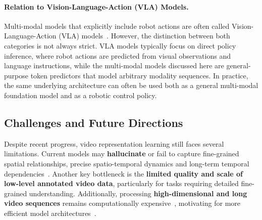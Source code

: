 \paragraph{Relation to Vision-Language-Action (VLA) Models.}
Multi-modal models that explicitly include robot actions are often called Vision-Language-Action (VLA) models~\cite{Din2025VisionLA, Kawaharazuka2025VisionLanguageActionMF}. 
However, the distinction between both categories is not always strict. 
\ac{VLA} models typically focus on direct policy inference, where robot actions are predicted from visual observations and language instructions, while the multi-modal models discussed here are general-purpose token predictors that model arbitrary modality sequences.
In practice, the same underlying architecture can often be used both as a general multi-modal foundation model and as a robotic control policy.







\subsection{Challenges and Future Directions}
Despite recent progress, video representation learning still faces several limitations. 
Current models may \textbf{hallucinate} or fail to capture fine-grained spatial relationships, precise spatio-temporal dynamics and long-term temporal dependencies~\cite{Lin2023VideoLLaVALU, Maaz2023VideoChatGPTTD, Yang2023LearningIR}. 
Another key bottleneck is the \textbf{limited quality and scale of low-level annotated video data}, particularly for tasks requiring detailed fine-grained understanding. 
Additionally, processing \textbf{high-dimensional and long video sequences} remains computationally expensive~\cite{McCarthy_2025}, motivating for more efficient model architectures~\cite{Yang2024VideoAT}. 
    
